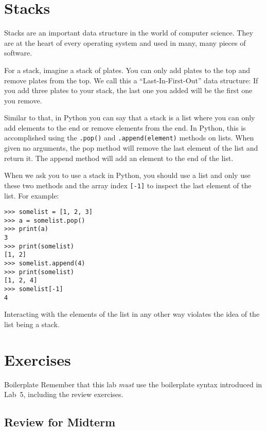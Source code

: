 \documentclass[11pt]{cselabheader}
\begin{document}
\pagebreak
\section{Stacks}
\label{sec:stacks}

Stacks are an important data structure in the world of computer
science. They are at the heart of every operating system and used in many, many
pieces of software.

For a stack, imagine a stack of plates. You can only add plates to the top and
remove plates from the top. We call this a ``Last-In-First-Out'' data structure:
If you add three plates to your stack, the last one you added will be the first
one you remove.

Similar to that, in Python you can say that a stack
is a list where you can only add elements to the end or remove elements from the
end. In Python, this is accomplished using the
\lstinline!.pop()! and \lstinline!.append(element)! methods on lists. When given
no arguments, the pop method will remove the last element of the list and return
it. The append method will add an element to the end of the list.

When we ask you to use a stack in Python, you should use a list and only use
these two methods and the array index \lstinline![-1]! to inspect the last
element of the list. For example:

\begin{lstlisting}[style=ipython]
>>> somelist = [1, 2, 3]
>>> a = somelist.pop()
>>> print(a)
3
>>> print(somelist)
[1, 2]
>>> somelist.append(4)
>>> print(somelist)
[1, 2, 4]
>>> somelist[-1]
4
\end{lstlisting}

Interacting with the elements of the list in any other way violates the
idea of the list being a stack.

\pagebreak

\section{Exercises}
\label{sec:ex}

\begin{warningbox}{Boilerplate}
  Remember that this lab \emph{must} use the
  boilerplate syntax introduced in Lab~5, including the review exercises.
\end{warningbox}

\subsection{Review for Midterm}
\label{subsec:reviewex}
\end{document}
